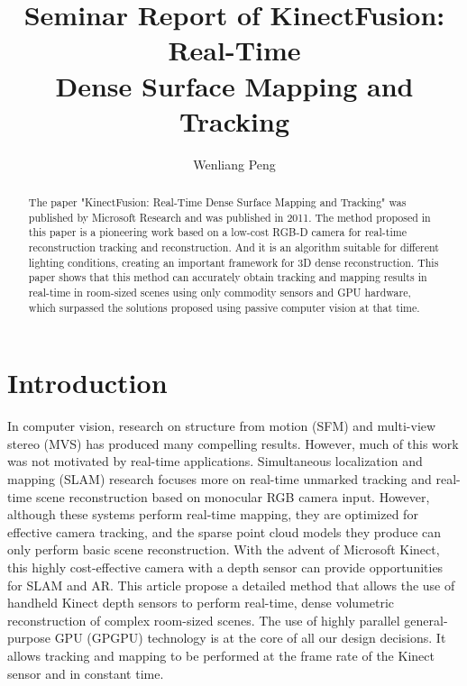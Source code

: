 \documentclass[a4paper,12pt]{article}
\title{Seminar Report of KinectFusion: Real-Time\\Dense Surface Mapping and Tracking} %
\author{Wenliang Peng} %
\institute{Faculty of Informatics - Technische Universit\"{a}t M\"{u}nchen} %
\begin{document}
\maketitle

\begin{abstract}
	The paper "KinectFusion: Real-Time Dense Surface Mapping and Tracking" was published by Microsoft Research and was published in 2011. 
	The method proposed in this paper is a pioneering work based on a low-cost RGB-D camera for real-time reconstruction tracking and reconstruction. 
	And it is an algorithm suitable for different lighting conditions, creating an important framework for 3D dense reconstruction. 
	This paper shows that this method can accurately obtain tracking and mapping results in real-time in room-sized scenes using only commodity sensors and GPU hardware, which surpassed the solutions proposed using passive computer vision at that time.
\end{abstract}

\section{Introduction}

In computer vision, research on structure from motion (SFM) and multi-view stereo (MVS) has produced many compelling results. 
However, much of this work was not motivated by real-time applications. 
Simultaneous localization and mapping (SLAM) research focuses more on real-time unmarked tracking and real-time scene reconstruction based on monocular RGB camera input. 
However, although these systems perform real-time mapping, they are optimized for effective camera tracking, and the sparse point cloud models they produce can only perform basic scene reconstruction.
With the advent of Microsoft Kinect, this highly cost-effective camera with a depth sensor can provide opportunities for SLAM and AR.
This article propose a detailed method that allows the use of handheld Kinect depth sensors to perform real-time, dense volumetric reconstruction of complex room-sized scenes. 
The use of highly parallel general-purpose GPU (GPGPU) technology is at the core of all our design decisions. It allows tracking and mapping to be performed at the frame rate of the Kinect sensor and in constant time\cite{6162880}.
\end{document}
